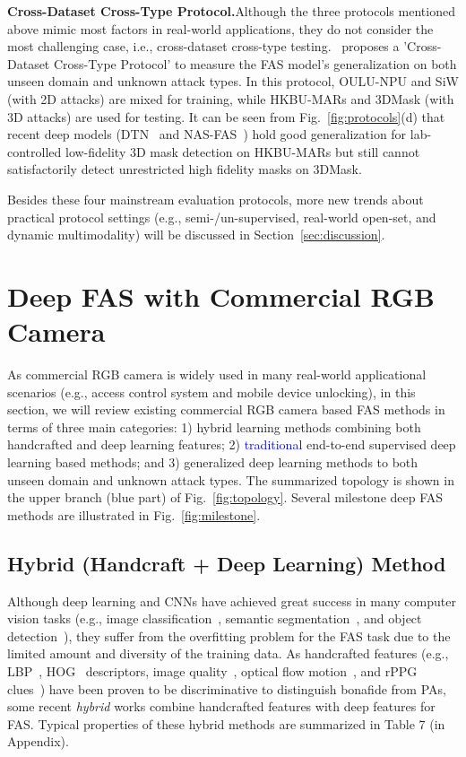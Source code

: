 \documentclass[10pt,journal,compsoc]{IEEEtran}
\begin{document}
\noindent\textbf{Cross-Dataset Cross-Type Protocol.}\quad Although the three protocols mentioned above mimic most factors in real-world applications, they do not consider the most challenging case, i.e., cross-dataset cross-type testing.~\cite{yu2020fas2} proposes a 'Cross-Dataset Cross-Type Protocol' to measure the FAS model's generalization on both unseen domain and unknown attack types.
In this protocol, OULU-NPU and SiW (with 2D attacks) are mixed for training, while HKBU-MARs and 3DMask (with 3D attacks) are used for testing. It can be seen from Fig.~\ref{fig:protocols}(d) that recent deep models (DTN~\cite{liu2019deep} and NAS-FAS~\cite{yu2020fas2}) hold good generalization for lab-controlled low-fidelity 3D mask detection on HKBU-MARs but still cannot satisfactorily detect unrestricted high fidelity masks on 3DMask.


Besides these four mainstream evaluation protocols, more new trends about practical protocol settings (e.g., semi-/un-supervised, real-world open-set, and dynamic multimodality) will be discussed in Section~\ref{sec:discussion}. 




\section{Deep FAS with Commercial RGB Camera} \label{sec:RGB}
As commercial RGB camera is widely used in many real-world applicational scenarios (e.g., access control system and mobile device unlocking), in this section, we will review existing commercial RGB camera based FAS methods in terms of three main categories: 1) hybrid learning methods combining both handcrafted and deep learning features; 2) \textcolor{blue}{traditional} end-to-end supervised deep learning based methods; and 3) generalized deep learning methods to both unseen domain and unknown attack types. The summarized topology is shown in the upper branch (blue part) of Fig.~\ref{fig:topology}. Several
milestone deep FAS methods are illustrated in Fig.~\ref{fig:milestone}. 



\subsection{Hybrid (Handcraft + Deep Learning) Method}
Although deep learning and CNNs have achieved great success in many computer vision tasks (e.g., image classification~\cite{He2015Deep,huang2017densely}, semantic segmentation~\cite{long2015fully}, and object detection~\cite{ren2016faster}), they suffer from the overfitting problem for the FAS task due to the limited amount and diversity of the training data. As handcrafted features (e.g., LBP~\cite{ahonen2006face}, HOG~\cite{dalal2005histograms} descriptors, image quality~\cite{galbally2014face}, optical flow motion~\cite{brox2010large}, and rPPG clues~\cite{niu2020video}) have been proven to be discriminative to distinguish bonafide from PAs, some recent \textit{hybrid} works combine handcrafted features with deep features for FAS. Typical properties of these hybrid methods are summarized in Table 7 (in Appendix).
\end{document}
